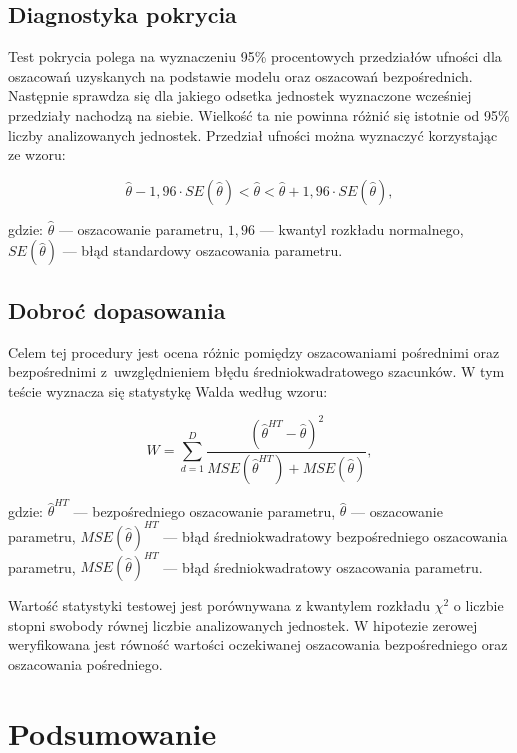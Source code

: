 \subsection{Diagnostyka pokrycia}

Test pokrycia polega na wyznaczeniu 95\% procentowych przedziałów ufności dla oszacowań uzyskanych na podstawie modelu oraz oszacowań bezpośrednich. Następnie sprawdza się dla jakiego odsetka jednostek wyznaczone wcześniej przedziały nachodzą na siebie. Wielkość ta nie powinna różnić się istotnie od 95\% liczby analizowanych jednostek. Przedział ufności można wyznaczyć korzystając ze wzoru:

\begin{equation}
\hat{\theta} - 1,96 \cdot SE(\hat{\theta}) < \hat{\theta} < \hat{\theta} + 1,96 \cdot SE(\hat{\theta}),
\end{equation}

gdzie: $\hat{\theta}$ --- oszacowanie parametru, $1,96$ --- kwantyl rozkładu normalnego, $SE(\hat{\theta})$ --- błąd standardowy oszacowania parametru.

\subsection{Dobroć dopasowania}

Celem tej procedury jest ocena różnic pomiędzy oszacowaniami pośrednimi oraz bezpośrednimi z~uwzględnieniem błędu średniokwadratowego szacunków. W tym teście wyznacza się statystykę Walda według wzoru:

\begin{equation}
W=\sum\limits_{d=1}^{D}{\frac{(\hat{\theta}^{HT}-\hat{\theta})^2}{MSE(\hat{\theta}^{HT})+MSE(\hat{\theta})}},
\end{equation}

gdzie: $\hat{\theta}^{HT}$ --- bezpośredniego oszacowanie parametru, $\hat{\theta}$ --- oszacowanie parametru, $MSE(\hat{\theta})^{HT}$ --- błąd średniokwadratowy bezpośredniego oszacowania parametru, $MSE(\hat{\theta})^{HT}$ --- błąd średniokwadratowy oszacowania parametru.

Wartość statystyki testowej jest porównywana z kwantylem rozkładu $\chi^2$ o liczbie stopni swobody równej liczbie analizowanych jednostek. W hipotezie zerowej weryfikowana jest równość wartości oczekiwanej oszacowania bezpośredniego oraz oszacowania pośredniego.

\section{Podsumowanie}

